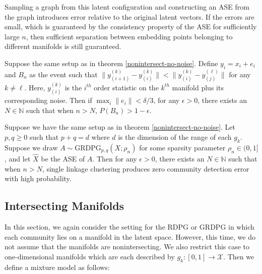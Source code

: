 \documentclass[12pt]{article}
\begin{document}
Sampling a graph from this latent configuration and constructing an ASE
from the graph introduces error relative to the original latent vectors.
If the errors are small, which is guaranteed by the consistency property
of the ASE for sufficiently large \(n\), then sufficient separation
between embedding points belonging to different manifolds is still
guaranteed.

\begin{theorem}
\label{nonintersect-with-noise}
Suppose the same setup as in theorem \ref{nonintersect-no-noise}. 
Define $y_i = x_i + e_i$ and $B_n$ as the event such that $\|y_{(i+1)}^{(k)} - y_{(i)}^{(k)}\| < \|y_{(i)}^{(k)} - y_{(j)}^{(\ell)}\|$ for any $k \neq \ell$. 
Here, $y_{(i)}^{(k)}$ is the $i^{th}$ order statistic on the $k^{th}$ manifold plus its corresponding noise. 
Then if $\max_i \|e_i\| < \delta / 3$, for any $\epsilon > 0$, there exists an $N \in \mathbb{N}$ such that when $n > N$, $P(B_n) > 1 - \epsilon$. 
\end{theorem}

\begin{theorem}
\label{nonintersect-mbm}
Suppose we have the same setup as in theorem \ref{nonintersect-no-noise}. 
Let $p, q \geq 0$ such that $p + q = d$ where $d$ is the dimension of the range of each $g_k$. 
Suppose we draw $A \sim \mathrm{GRDPG}_{p,q}(X; \rho_n)$ for some sparsity parameter $\rho_n \in (0, 1]$, and let $\hat{X}$ be the ASE of $A$. 
Then for any $\epsilon > 0$, there exists an $N \in \mathbb{N}$ such that when $n > N$, single linkage clustering produces zero community detection error with high probability. 
\end{theorem}

\hypertarget{intersecting-manifolds}{%
\subsection{Intersecting Manifolds}\label{intersecting-manifolds}}

\label{section:intersecting}

In this section, we again consider the setting for the RDPG or GRDPG in
which each community lies on a manifold in the latent space. However,
this time, we do not assume that the manifolds are nonintersecting. We
also restrict this case to one-dimensional manifolds which are each
described by \(g_k : [0, 1] \to \mathcal{X}\). Then we define a mixture
model as follows:
\end{document}
